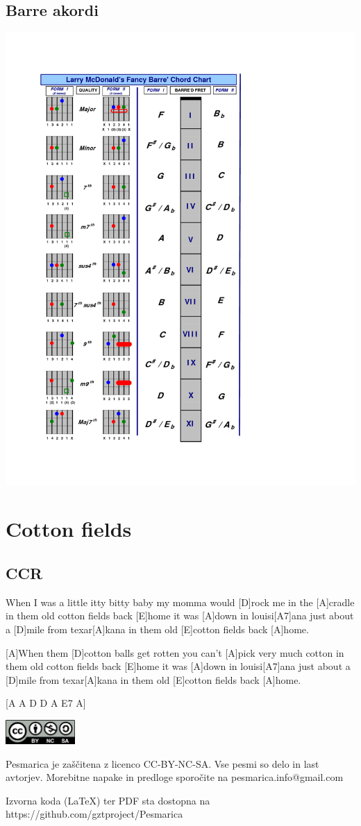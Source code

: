\documentclass[a4paper,12pt]{article}
\begin{document}
\begin{multicols}{2}
\subsection*{Barre akordi}
\includegraphics[width=140mm]{img/barre.png}
\clearpage
\section{Cotton fields}
\subsection*{CCR}
\begin{guitar}
[A]When I was a little itty bitty baby
my momma would [D]rock me in the [A]cradle
in them old cotton fields back [E]home
it was [A]down in louisi[A7]ana
just about a [D]mile from texar[A]kana
in them old [E]cotton fields back [A]home.

	
[A]When them [D]cotton balls get rotten
you can't [A]pick very much cotton
in them old cotton fields back [E]home
it was [A]down in louisi[A7]ana
just about a [D]mile from texar[A]kana
in them old [E]cotton fields back [A]home.


[A A D D A E7 A]

\end{guitar}
\end{multicols}
\clearpage
\clearpage
\null
\vfill
\center
\includegraphics[width=100px]{img/licence.png}

Pesmarica je zaščitena z licenco CC-BY-NC-SA. Vse pesmi so delo in last avtorjev. Morebitne napake in predloge sporočite na pesmarica.info@gmail.com 

Izvorna koda (LaTeX) ter PDF sta dostopna na https://github.com/gztproject/Pesmarica
\end{document}

